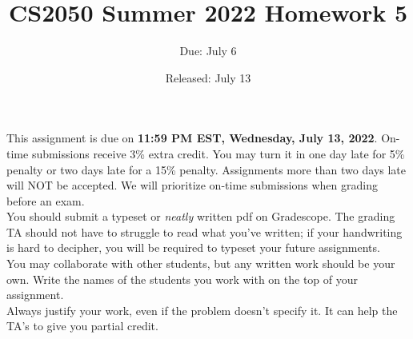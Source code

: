 \documentclass{article}
\title{CS2050 Summer 2022 Homework 5}
\author{Due: July 6}
\date{Released: July 13}
\begin{document}
\maketitle

This assignment is due on \textbf{11:59 PM EST, Wednesday, July 13, 2022}.  On-time submissions receive 3\% extra credit. You may turn it in one day late for 5\% penalty or two days late for a 15\% penalty. Assignments more than two days late will NOT be accepted.  We will prioritize on-time submissions when grading before an exam. \\ 

You should submit a typeset or \emph{neatly} written pdf on Gradescope.  The grading TA should not have to struggle to read what you've written; if your handwriting is hard to decipher, you will be required to typeset your future assignments.\\ 

You may collaborate with other students, but any written work should be your own. Write the names of the students you work with on the top of your assignment.\\

Always justify your work, even if the problem doesn't specify it. It can help the TA's to give you partial credit.
\end{document}
